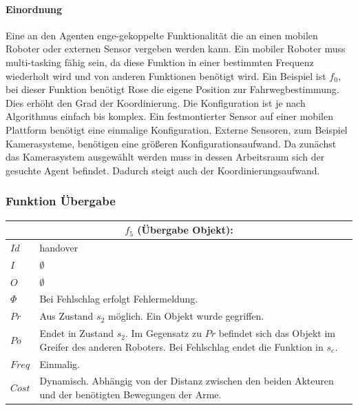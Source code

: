 \paragraph{Einordnung}
Eine an den Agenten enge-gekoppelte Funktionalität die an einen mobilen Roboter oder externen Sensor vergeben werden kann. Ein mobiler Roboter muss multi-tasking fähig sein, da diese Funktion in einer bestimmten Frequenz wiederholt wird und von anderen Funktionen benötigt wird. Ein Beispiel ist $f_0$, bei dieser Funktion benötigt Rose die eigene Position zur Fahrwegbestimmung. Dies erhöht den Grad der Koordinierung. Die Konfiguration ist je nach Algorithmus einfach bis komplex. Ein festmontierter Sensor auf einer mobilen Plattform benötigt eine einmalige Konfiguration. Externe Sensoren, zum Beispiel Kamerasysteme, benötigen eine größeren Konfigurationsaufwand. Da zunächst das Kamerasystem ausgewählt werden muss in dessen Arbeitsraum sich der gesuchte Agent befindet. Dadurch steigt auch der Koordinierungsaufwand.

\subsubsection{Funktion Übergabe}
\begin{tabular}{|p{3cm}|p{10cm}|}
	\multicolumn{2}{c}{$f_5$ (Übergabe Objekt):}\\
	\hline  $Id$ & handover\\ 
	\hline  $I$ & $\emptyset$ \\ 
	\hline  $O$ & $\emptyset$ \\ 
	\hline  $\Phi$ & Bei Fehlschlag erfolgt Fehlermeldung.\\ 
	\hline $Pr$ & Aus Zustand $s_2$ möglich. Ein Objekt wurde gegriffen.  \\ 
	\hline $Po$ & Endet in Zustand $s_2$. Im Gegensatz zu $Pr$ befindet sich das Objekt im Greifer des anderen Roboters. Bei Fehlschlag endet die Funktion in $s_e$.\\ 
	\hline $Freq$ & Einmalig.\\ 
	\hline $Cost$ & Dynamisch. Abhängig von der Distanz zwischen den beiden Akteuren und der benötigten Bewegungen der Arme. \\
	\hline
\end{tabular} 

